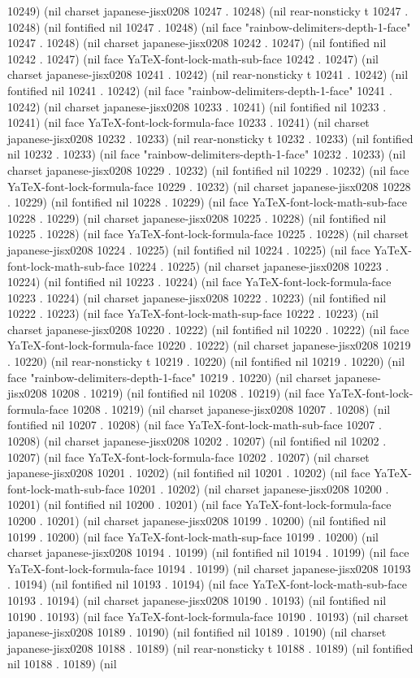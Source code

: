 10249) (nil charset japanese-jisx0208 10247 . 10248) (nil rear-nonsticky t 10247 . 10248) (nil fontified nil 10247 . 10248) (nil face "rainbow-delimiters-depth-1-face" 10247 . 10248) (nil charset japanese-jisx0208 10242 . 10247) (nil fontified nil 10242 . 10247) (nil face YaTeX-font-lock-math-sub-face 10242 . 10247) (nil charset japanese-jisx0208 10241 . 10242) (nil rear-nonsticky t 10241 . 10242) (nil fontified nil 10241 . 10242) (nil face "rainbow-delimiters-depth-1-face" 10241 . 10242) (nil charset japanese-jisx0208 10233 . 10241) (nil fontified nil 10233 . 10241) (nil face YaTeX-font-lock-formula-face 10233 . 10241) (nil charset japanese-jisx0208 10232 . 10233) (nil rear-nonsticky t 10232 . 10233) (nil fontified nil 10232 . 10233) (nil face "rainbow-delimiters-depth-1-face" 10232 . 10233) (nil charset japanese-jisx0208 10229 . 10232) (nil fontified nil 10229 . 10232) (nil face YaTeX-font-lock-formula-face 10229 . 10232) (nil charset japanese-jisx0208 10228 . 10229) (nil fontified nil 10228 . 10229) (nil face YaTeX-font-lock-math-sub-face 10228 . 10229) (nil charset japanese-jisx0208 10225 . 10228) (nil fontified nil 10225 . 10228) (nil face YaTeX-font-lock-formula-face 10225 . 10228) (nil charset japanese-jisx0208 10224 . 10225) (nil fontified nil 10224 . 10225) (nil face YaTeX-font-lock-math-sub-face 10224 . 10225) (nil charset japanese-jisx0208 10223 . 10224) (nil fontified nil 10223 . 10224) (nil face YaTeX-font-lock-formula-face 10223 . 10224) (nil charset japanese-jisx0208 10222 . 10223) (nil fontified nil 10222 . 10223) (nil face YaTeX-font-lock-math-sup-face 10222 . 10223) (nil charset japanese-jisx0208 10220 . 10222) (nil fontified nil 10220 . 10222) (nil face YaTeX-font-lock-formula-face 10220 . 10222) (nil charset japanese-jisx0208 10219 . 10220) (nil rear-nonsticky t 10219 . 10220) (nil fontified nil 10219 . 10220) (nil face "rainbow-delimiters-depth-1-face" 10219 . 10220) (nil charset japanese-jisx0208 10208 . 10219) (nil fontified nil 10208 . 10219) (nil face YaTeX-font-lock-formula-face 10208 . 10219) (nil charset japanese-jisx0208 10207 . 10208) (nil fontified nil 10207 . 10208) (nil face YaTeX-font-lock-math-sub-face 10207 . 10208) (nil charset japanese-jisx0208 10202 . 10207) (nil fontified nil 10202 . 10207) (nil face YaTeX-font-lock-formula-face 10202 . 10207) (nil charset japanese-jisx0208 10201 . 10202) (nil fontified nil 10201 . 10202) (nil face YaTeX-font-lock-math-sub-face 10201 . 10202) (nil charset japanese-jisx0208 10200 . 10201) (nil fontified nil 10200 . 10201) (nil face YaTeX-font-lock-formula-face 10200 . 10201) (nil charset japanese-jisx0208 10199 . 10200) (nil fontified nil 10199 . 10200) (nil face YaTeX-font-lock-math-sup-face 10199 . 10200) (nil charset japanese-jisx0208 10194 . 10199) (nil fontified nil 10194 . 10199) (nil face YaTeX-font-lock-formula-face 10194 . 10199) (nil charset japanese-jisx0208 10193 . 10194) (nil fontified nil 10193 . 10194) (nil face YaTeX-font-lock-math-sub-face 10193 . 10194) (nil charset japanese-jisx0208 10190 . 10193) (nil fontified nil 10190 . 10193) (nil face YaTeX-font-lock-formula-face 10190 . 10193) (nil charset japanese-jisx0208 10189 . 10190) (nil fontified nil 10189 . 10190) (nil charset japanese-jisx0208 10188 . 10189) (nil rear-nonsticky t 10188 . 10189) (nil fontified nil 10188 . 10189) (nil 